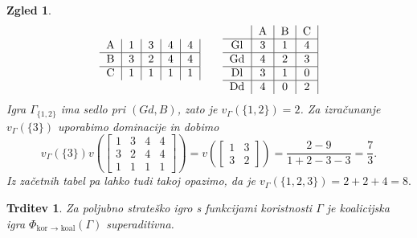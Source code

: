 \documentclass[10pt, a4paper]{article}
\newtheorem{trditev}[izr]{Trditev}
\newtheorem{zgled}[izr]{Zgled}
\begin{document}
\begin{zgled}
$${\begin{tabular}{c|c|c|c|c|}
  \textrm{A} & 1 & 3 & 4 & 4\\
  \hline
  \textrm{B} & 3 & 2 & 4 & 4\\
  \hline
  \textrm{C} & 1 & 1 & 1 & 1
\end{tabular}}\qquad 
{\begin{tabular}{c|c|c|c|}
  & \textrm{A} & \textrm{B} & \textrm{C}\\
  \hline
  \textrm{Gl} & 3 & 1 & 4\\
  \hline
  \textrm{Gd} & 4 & 2 & 3\\
  \hline
  \textrm{Dl} & 3 & 1 & 0\\
  \hline 
  \textrm{Dd} & 4 & 0 & 2\\
\end{tabular}}
$$
Igra $\Gamma_{\{1, 2\}}$ ima sedlo pri $(Gd, B)$, zato je $v_{\Gamma} (\{1, 2\}) = 2$.
Za izračunanje $v_\Gamma (\{3\})$ uporabimo dominacije in dobimo 
$$v_\Gamma (\{3\}) v\left(\begin{bmatrix}
  1 & 3 & 4 & 4\\
  3 & 2 & 4 & 4\\
  1 & 1 & 1 & 1
\end{bmatrix}\right) = v\left(\begin{bmatrix}
  1 & 3\\
  3 & 2
\end{bmatrix}\right) = \frac{2 - 9}{1 + 2 - 3 - 3} = \frac{7}{3}.$$
Iz začetnih tabel pa lahko tudi takoj opazimo, da je $v_\Gamma (\{1, 2, 3\}) = 2 + 2 + 4 = 8.$
\end{zgled}

\begin{trditev}
  Za poljubno strateško igro s funkcijami koristnosti $\Gamma$
  je koalicijska igra $\Phi_{\text{kor $\to$ koal}} (\Gamma)$ superaditivna.
\end{trditev}
\end{document}
